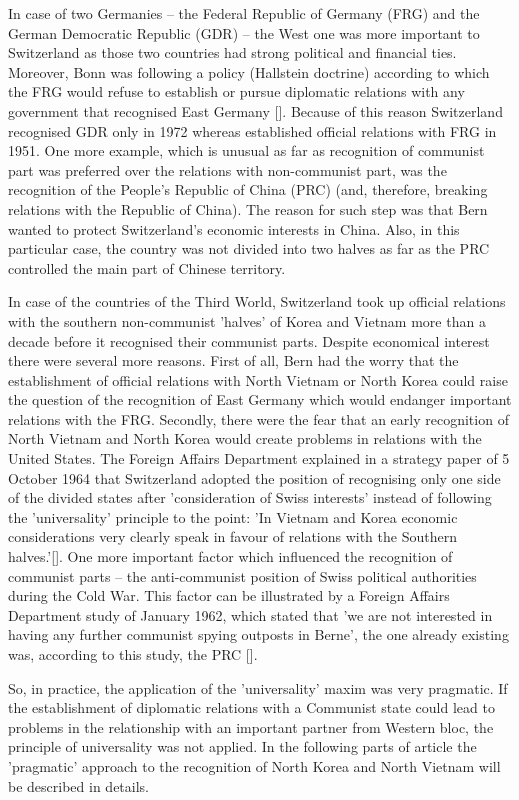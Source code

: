 \documentclass[a4paper]{article}
\begin{document}
In case of two Germanies – the Federal Republic of Germany (FRG) and the German Democratic Republic (GDR) – the West one was more important to Switzerland as those two countries had strong political and financial ties. Moreover, Bonn was following a policy (Hallstein doctrine) according to which the FRG would refuse to establish or pursue diplomatic relations with any government that recognised East Germany []. Because of this reason Switzerland recognised GDR only in 1972 whereas established official relations with FRG in 1951. One more example, which is unusual as far as recognition of communist part was preferred over the relations with non-communist part, was the recognition of the People’s Republic of China (PRC) (and, therefore, breaking relations with the Republic of China). The reason for such step was that Bern wanted to protect Switzerland’s economic interests in China. Also, in this particular case, the country was not divided into two halves as far as the PRC controlled the main part of Chinese territory.

In case of the countries of the Third World, Switzerland took up official relations with the southern non-communist 'halves' of Korea and Vietnam more than a decade before it recognised their communist parts. Despite economical interest there were several more reasons. First of all, Bern had the worry that the establishment of official relations with North Vietnam or North Korea could raise the question of the recognition of East Germany which would endanger important relations with the FRG. Secondly, there were the fear that an early recognition of North Vietnam and North Korea would create problems in relations with the United States. The Foreign Affairs Department explained in a strategy paper of 5 October 1964 that Switzerland adopted the position of recognising only one side of the divided states after 'consideration of Swiss interests' instead of following the 'universality' principle to the point: 'In Vietnam and Korea economic considerations very clearly speak in favour of relations with the Southern halves.'[]. One more important factor which influenced the recognition of communist parts – the anti-communist position of Swiss political authorities during the Cold War. This factor can be illustrated by a Foreign Affairs Department study of January 1962, which stated that 'we are not interested in having any further communist spying outposts in Berne', the one already existing was, according to this study, the PRC [].

So, in practice, the application of the 'universality' maxim was very pragmatic. If the establishment of diplomatic relations with a Communist state could lead to problems in the relationship with an important partner from Western bloc, the principle of universality was not applied. In the following parts of article the 'pragmatic' approach to the recognition of North Korea and North Vietnam will be described in details.
\end{document}
